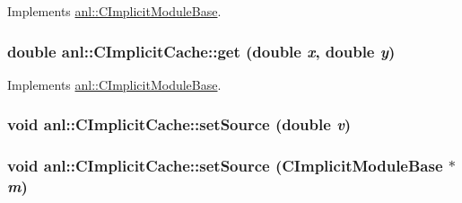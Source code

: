 Implements \hyperlink{classanl_1_1CImplicitModuleBase_ac17d592612c82ba3d47f9229a00b1fe3}{anl::CImplicitModuleBase}.\hypertarget{classanl_1_1CImplicitCache_a90f12b78d1a0b263d2fc142df64a52c9}{
\subsubsection[{get}]{\setlength{\rightskip}{0pt plus 5cm}double anl::CImplicitCache::get (double {\em x}, \/  double {\em y})}}
\label{classanl_1_1CImplicitCache_a90f12b78d1a0b263d2fc142df64a52c9}


Implements \hyperlink{classanl_1_1CImplicitModuleBase_ab88f8a1822dcfbc13ba5230318b0acd1}{anl::CImplicitModuleBase}.\hypertarget{classanl_1_1CImplicitCache_a4941a8a7235fb8e9898e82b41f56e4ec}{
\subsubsection[{setSource}]{\setlength{\rightskip}{0pt plus 5cm}void anl::CImplicitCache::setSource (double {\em v})}}
\label{classanl_1_1CImplicitCache_a4941a8a7235fb8e9898e82b41f56e4ec}
\hypertarget{classanl_1_1CImplicitCache_a63e1430f37d3119878954f19fe25629b}{
\subsubsection[{setSource}]{\setlength{\rightskip}{0pt plus 5cm}void anl::CImplicitCache::setSource ({\bf CImplicitModuleBase} $\ast$ {\em m})}}
\label{classanl_1_1CImplicitCache_a63e1430f37d3119878954f19fe25629b}


